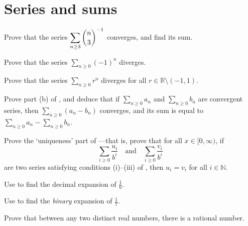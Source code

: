 \section{Series and sums}


\begin{exercise}
Prove that the series $\displaystyle \sum_{n \ge 3} \dbinom{n}{3}^{-1}$ converges, and find its sum.
\end{exercise}


\begin{exercise}
\label{exAlternatingSeriesOfOneDiverges}
Prove that the series $\sum_{n \ge 0} (-1)^n$ diverges.
\end{exercise}


\begin{exercise}
Prove that the series $\displaystyle \sum_{n \ge 0} r^n$ diverges for all $r \in \mathbb{R} \setminus (-1,1)$.
\end{exercise}


\begin{exercise}
Prove part (b) of , and deduce that if $\displaystyle \sum_{n \ge 0} a_n$ and $\displaystyle \sum_{n \ge 0} b_n$ are convergent series, then $\displaystyle \sum_{n \ge 0} (a_n - b_n)$ converges, and its sum is equal to $\displaystyle \sum_{n \ge 0} a_n - \sum_{n \ge 0} b_n$.
\end{exercise}


\begin{exercise}
Prove the `uniqueness' part of ---that is, prove that for all $x \in [0,\infty)$, if
\[ \sum_{i \ge 0} \dfrac{u_i}{b^i} \quad \text{and} \quad \sum_{i \ge 0} \dfrac{v_i}{b^i} \]
are two series satisfying conditions (i)--(iii) of , then $u_i=v_i$ for all $i \in \mathbb{N}$.
\end{exercise}


\begin{exercise}
Use  to find the decimal expansion of $\frac{1}{6}$.
\end{exercise}

\begin{exercise}
Use  to find the \textit{binary} expansion of $\frac{1}{7}$.
\end{exercise}

\begin{exercise}
Prove that between any two distinct real numbers, there is a rational number.
\end{exercise}

